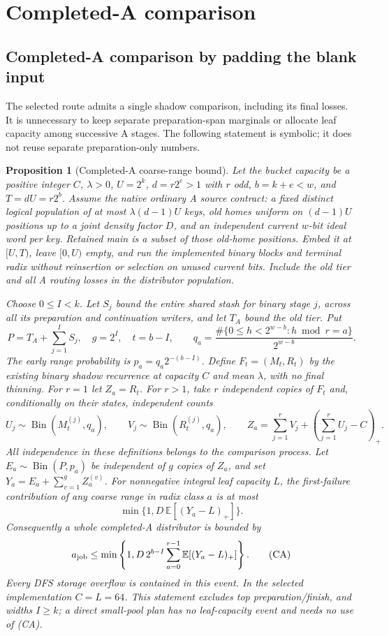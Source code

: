 \documentclass[11pt]{article}
\newtheorem{proposition}[theorem]{Proposition}
\theoremstyle{definition}
\theoremstyle{remark}
\begin{document}
\section{Completed-A comparison}
\label{sec:separated-residuals}\label{sec:dfs-application}
\subsection{Completed-A comparison by padding the blank input}
\label{sec:completed-a-shadow}
The selected route admits a single shadow comparison, including its final
losses. It is unnecessary to keep separate preparation-span marginals or
allocate leaf capacity among successive A stages. The following statement
is symbolic; it does not reuse separate preparation-only numbers.

\begin{proposition}[Completed-A coarse-range bound]
Let the bucket capacity be a positive integer $C$, $\lambda>0$, $U=2^k$, $d=r2^e>1$ with $r$ odd,
$b=k+e<w$, and $T=dU=r2^b$. Assume the native ordinary A source contract:
a fixed distinct logical population of at most $\lambda(d-1)U$ keys,
old homes uniform on $(d-1)U$ positions up to a joint density factor $D$,
and an independent current $w$-bit ideal word per key. Retained main is a
subset of those old-home positions. Embed it at $[U,T)$, leave $[0,U)$
empty, and run the implemented binary blocks and terminal radix without
reinsertion or selection on unused current bits. Include the old tier and
\emph{all} A routing losses in the distributor population.

Choose $0\le I<k$. Let $S_j$ bound the entire shared stash for binary
stage $j$, across all its preparation and continuation writers, and let
$T_A$ bound the old tier. Put
\[
 P=T_A+\sum_{j=1}^{I}S_j,\quad g=2^I,\quad t=b-I,
 \qquad q_a=\frac{\#\{0\le h<2^{w-b}:h\bmod r=a\}}{2^{w-b}}.
\]
The early range probability is $p_a=q_a2^{-(b-I)}$.
Define $F_t=(M_t,R_t)$ by the existing binary shadow recurrence at capacity
$C$ and mean $\lambda$, with \emph{no final thinning}. For $r=1$ let
$Z_a=R_t$. For $r>1$, take $r$ independent copies of $F_t$ and,
conditionally on their states, independent counts
\[
 U_j\sim\operatorname{Bin}(M_t^{(j)},q_a),\qquad
 V_j\sim\operatorname{Bin}(R_t^{(j)},q_a),\qquad
 Z_a=\sum_{j=1}^r V_j+\left(\sum_{j=1}^r U_j-C\right)_+.
\]
All independence in these definitions belongs to the comparison process.
Let $E_a\sim\operatorname{Bin}(P,p_a)$ be independent of $g$ copies of
$Z_a$, and set $Y_a=E_a+\sum_{v=1}^{g}Z_a^{(v)}$. For nonnegative integral leaf
capacity $L$, the first-failure contribution of any coarse range in radix
class $a$ is at most
\[
 \min\{1,D\,\mathbb E[(Y_a-L)_+]\}.
\]
Consequently a whole completed-A distributor is bounded by
\[
 a_{\rm job}\le
 \min\left\{1,D\,2^{b-I}\sum_{a=0}^{r-1}
                   \mathbb E[(Y_a-L)_+]\right\}.                 \tag{CA}
\]
Every DFS storage overflow is contained in this event. In the selected
implementation $C=L=64$. This statement excludes top
preparation/finish, and widths $I\ge k$; a direct small-pool plan has no
leaf-capacity event and needs no use of (CA).
\end{proposition}
\end{document}
